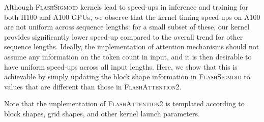 \noindent Although \textsc{FlashSigmoid} kernels lead to speed-ups in inference and training for both H100 and A100 GPUs, we observe that the kernel timing speed-ups on A100 are not uniform across sequence lengths: for a small subset of these, our kernel provides significantly lower speed-up compared to the overall trend for other sequence lengths.
Ideally, the implementation of attention mechanisms should not assume any information on the token count in input, and it is then desirable to have uniform speed-ups across all input lengths. 
Here, we show that this is achievable by simply updating the block shape information in \textsc{FlashSigmoid} to values that are different than those in \textsc{FlashAttention2}. 


\noindent Note that the implementation of \textsc{FlashAttention2} is templated according to block shapes, grid shapes, and other kernel launch parameters.


